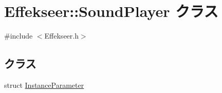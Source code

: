 \hypertarget{class_effekseer_1_1_sound_player}{}\section{Effekseer\+:\+:Sound\+Player クラス}
\label{class_effekseer_1_1_sound_player}


{\ttfamily \#include $<$Effekseer.\+h$>$}

\subsection*{クラス}
\begin{DoxyCompactItemize}
\item 
struct \mbox{\hyperlink{struct_effekseer_1_1_sound_player_1_1_instance_parameter}{Instance\+Parameter}}
\end{DoxyCompactItemize}
